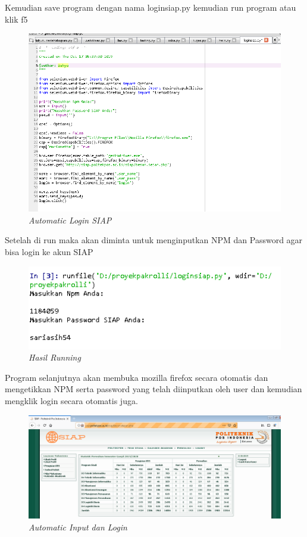 Kemudian save program dengan nama loginsiap.py kemudian run program atau klik f5
\begin{figure}[H]
    \centering
    \includegraphics[scale=0.5]{figures/a10}
    \caption{\textit{Automatic Login SIAP}}
    \label{Automatic1}
\end{figure}
Setelah di run maka akan diminta untuk menginputkan NPM dan Password agar bisa login ke akun SIAP
\begin{figure}[H]
    \centering
    \includegraphics[scale=0.5]{figures/a11}
    \caption{\textit{Hasil Running}}
    \label{Automatic2}
\end{figure}
Program selanjutnya akan membuka mozilla firefox secara otomatis dan mengetikkan NPM serta password yang telah diinputkan oleh user dan kemudian mengklik login secara otomatis juga.
\begin{figure}[H]
    \centering
    \includegraphics[scale=0.4]{figures/a12}
    \caption{\textit{Automatic Input dan Login}}
    \label{Automatic3}
\end{figure}


